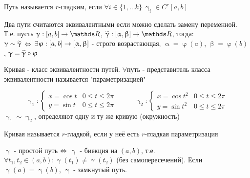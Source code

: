 \documentclass[12pt, fleqn]{article}
\begin{document}
\begin{Property}[3]
\begin{Property}[4]
\begin{Property}[2, аддитивность]
\begin{Proof}
\begin{definition}
    Путь называется $r$-гладким, если $\forall i \in \{1,...k\}\ \upgamma_i \in C^r[a,b]$
\end{definition}

\begin{definition}
    Два пути считаются эквивалентными если можно сделать замену переменной. Т.е. пусть $\upgamma: [a,b] \rightarrow \R$, $\w{\upgamma}: [\upalpha, \upbeta] \rightarrow \R$, тогда: 
    \\
    $\upgamma \sim \widetilde{\upgamma}$ $\Leftrightarrow$ $\exists \upvarphi: [a,b] \rightarrow [\upalpha, \upbeta]$ - строго возрастающая, $\upalpha = \upvarphi (a)$, $\upbeta = \upvarphi (b)$, $\upgamma = \widetilde{\upgamma} \circ \upvarphi$
\end{definition}

\begin{definition}
    Кривая - класс эквивалентности путей. $\forall$путь - представитель класса эквивалентности называется "параметризацией"
\end{definition}

\begin{Example}
    \begin{equation*}
    \upgamma_1: \begin{cases}
       x = \cos t & 0 \leqslant t \leqslant 2 \pi\\
       y = \sin t & 0 \leqslant t \leqslant 2 \pi
    \end{cases}\ \ \ \ \ \ \ \ \ \ \ \ 
    \upgamma_2: \begin{cases}
       x = \cos t^2 & 0 \leqslant t \leqslant 2 \pi\\
       y = \sin t^2 & 0 \leqslant t \leqslant 2 \pi
     \end{cases}
    \end{equation*}
    $\upgamma_1 \sim \upgamma_2$, определяют одну и ту же кривую (окружность)
\end{Example}

\begin{definition}
    Кривая называется $r$-гладкой, если у неё есть $r$-гладкая параметризация
\end{definition}

\begin{definition}
    $\upgamma$ - простой путь $\Leftrightarrow$ $\upgamma$ - биекция на $(a,b)$, т.е. $\forall t_1, t_2 \in (a,b): \upgamma(t_1) \neq \upgamma(t_2)$ (без самопересечений). Если $\upgamma(a) = \upgamma(b)$, $\upgamma$ - замкнутый путь.
\end{definition}


\end{Proof}
\end{Property}
\end{Property}
\end{Property}
\end{document}
